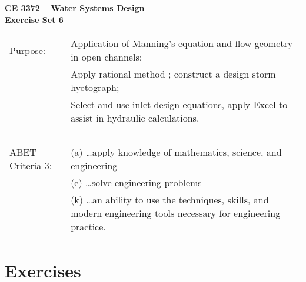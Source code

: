 \documentclass[12pt]{article}
\begin{document}
\begin{center}
{\textbf{{ CE 3372 -- Water Systems Design} \\ {Exercise Set 6}}}
\end{center}

\begingroup
\begin{tabular}{p{1.5in} p{5in}}
Purpose: & Application of Manning's equation and flow geometry in open channels; \\
~ & Apply rational method ; construct a design storm hyetograph; \\
~ & Select and use inlet design equations, apply Excel to assist in hydraulic calculations. \\
~ & ~ \\
ABET Criteria 3: & (a) \dots apply knowledge of mathematics, science, and engineering  \\
~ & (e)  \dots solve engineering problems  \\
~ & (k) \dots an ability to use the techniques, skills, and modern engineering tools necessary for engineering practice. \\
\end{tabular}
\endgroup
\section*{\small{Exercises}}
\end{document}
